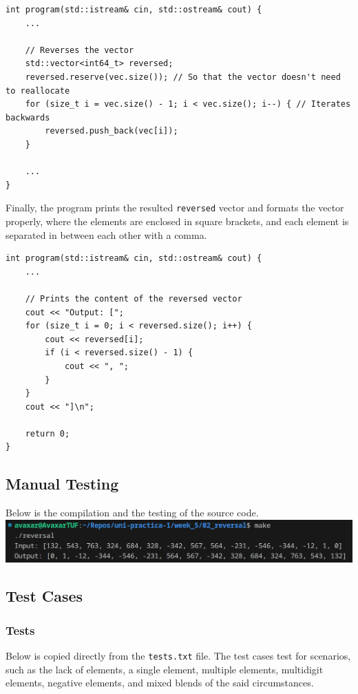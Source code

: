 \documentclass[12pt]{article}
\begin{document}
\begin{verbatim}
int program(std::istream& cin, std::ostream& cout) {
    ...

    // Reverses the vector
    std::vector<int64_t> reversed;
    reversed.reserve(vec.size()); // So that the vector doesn't need to reallocate
    for (size_t i = vec.size() - 1; i < vec.size(); i--) { // Iterates backwards
        reversed.push_back(vec[i]);
    }

    ...
}
\end{verbatim}

Finally, the program prints the resulted \texttt{reversed} vector and formats the vector properly, where the elements are enclosed in square brackets, and each element is separated in between each other with a comma.

\begin{verbatim}
int program(std::istream& cin, std::ostream& cout) {
    ...

    // Prints the content of the reversed vector
    cout << "Output: [";
    for (size_t i = 0; i < reversed.size(); i++) {
        cout << reversed[i];
        if (i < reversed.size() - 1) {
            cout << ", ";
        }
    }
    cout << "]\n";

    return 0;
}
\end{verbatim}

\subsection{Manual Testing}
Below is the compilation and the testing of the source code.
\newline\includegraphics[width=\textwidth]{02_reversal}

\subsection{Test Cases}

\subsubsection{Tests}
Below is copied directly from the \texttt{tests.txt} file. The test cases test for scenarios, such as the lack of elements, a single element, multiple elements, multidigit elements, negative elements, and mixed blends of the said circumstances.
\inputminted{text}{02_reversal/tests.txt}
\end{document}
